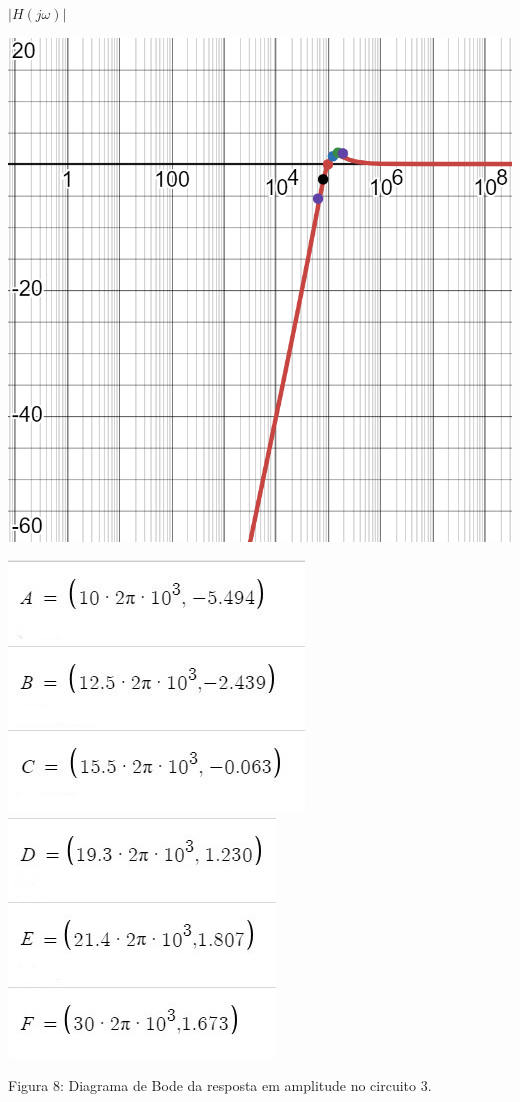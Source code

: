 \documentclass[a4 paper]{article}
\begin{document}
$|H(j\omega)|$
\begin{table}[h]
\centering
\includegraphics[scale=0.425]{figuras/bode-circ3}
\end{table}\vspace{-9.5cm}\marginpar{\textbf{$\omega$}}
\vspace{9cm}
\begin{table}[h]
\centering
\includegraphics[scale=0.5]{figuras/pontosamplitude3-1}\includegraphics[scale=0.5]{figuras/pontosamplitude3}
\end{table}
\begin{center}
Figura 8: Diagrama de Bode da resposta em amplitude no circuito 3.
\end{center}
\end{document}

